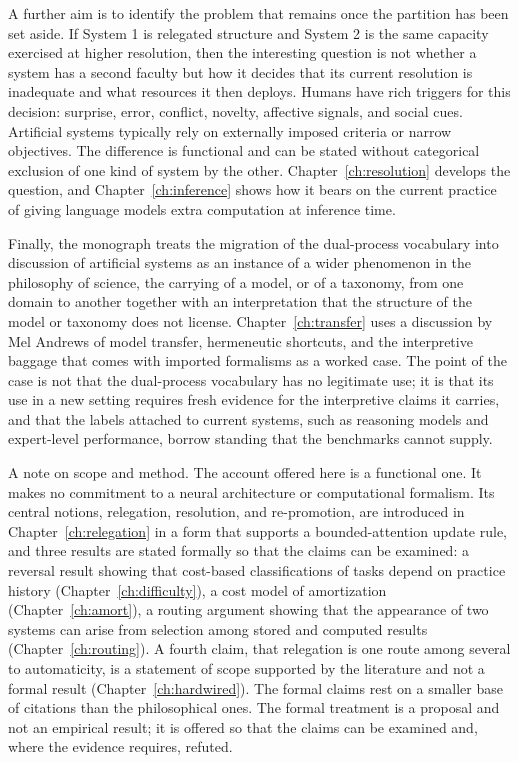 \documentclass[11pt]{report}
\theoremstyle{remark}
\theoremstyle{definition}
\begin{document}
A further aim is to identify the problem that remains once the partition has been set aside. If System 1 is relegated structure and System 2 is the same capacity exercised at higher resolution, then the interesting question is not whether a system has a second faculty but how it decides that its current resolution is inadequate and what resources it then deploys. Humans have rich triggers for this decision: surprise, error, conflict, novelty, affective signals, and social cues. Artificial systems typically rely on externally imposed criteria or narrow objectives. The difference is functional and can be stated without categorical exclusion of one kind of system by the other. Chapter~\ref{ch:resolution} develops the question, and Chapter~\ref{ch:inference} shows how it bears on the current practice of giving language models extra computation at inference time.

Finally, the monograph treats the migration of the dual-process vocabulary into discussion of artificial systems as an instance of a wider phenomenon in the philosophy of science, the carrying of a model, or of a taxonomy, from one domain to another together with an interpretation that the structure of the model or taxonomy does not license. Chapter~\ref{ch:transfer} uses a discussion by Mel Andrews of model transfer, hermeneutic shortcuts, and the interpretive baggage that comes with imported formalisms as a worked case. The point of the case is not that the dual-process vocabulary has no legitimate use; it is that its use in a new setting requires fresh evidence for the interpretive claims it carries, and that the labels attached to current systems, such as reasoning models and expert-level performance, borrow standing that the benchmarks cannot supply.

A note on scope and method. The account offered here is a functional one. It makes no commitment to a neural architecture or computational formalism. Its central notions, relegation, resolution, and re-promotion, are introduced in Chapter~\ref{ch:relegation} in a form that supports a bounded-attention update rule, and three results are stated formally so that the claims can be examined: a reversal result showing that cost-based classifications of tasks depend on practice history (Chapter~\ref{ch:difficulty}), a cost model of amortization (Chapter~\ref{ch:amort}), a routing argument showing that the appearance of two systems can arise from selection among stored and computed results (Chapter~\ref{ch:routing}). A fourth claim, that relegation is one route among several to automaticity, is a statement of scope supported by the literature and not a formal result (Chapter~\ref{ch:hardwired}). The formal claims rest on a smaller base of citations than the philosophical ones. The formal treatment is a proposal and not an empirical result; it is offered so that the claims can be examined and, where the evidence requires, refuted.
\end{document}
